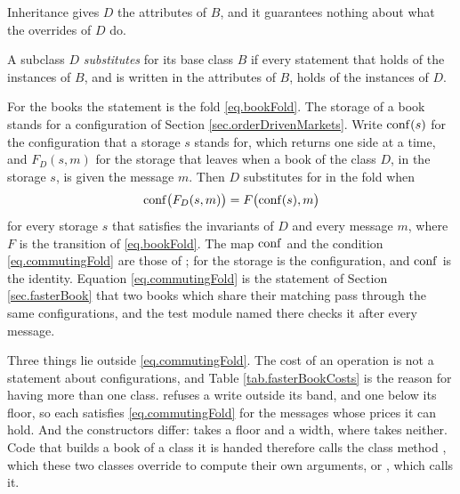 Inheritance gives $D$ the attributes of $B$,
and it guarantees nothing about what the overrides of $D$ do.

\begin{defi}\label{def.substitution}
 A subclass $D$ \emph{substitutes} for its base class $B$
 if every statement that holds of the instances of $B$,
 and is written in the attributes of $B$,
 holds of the instances of $D$.
\end{defi}

For the books the statement is the fold \eqref{eq.bookFold}.
The storage of a book stands for a configuration of Section \ref{sec.orderDrivenMarkets}.
Write $\mathrm{conf}(s)$ for the configuration that a storage $s$ stands for,
which  returns one side at a time,
and $F_D(s, m)$ for the storage that  leaves
when a book of the class $D$, in the storage $s$, is given the message $m$.
Then $D$ substitutes for  in the fold when
\begin{equation}\label{eq.commutingFold}
 \mathrm{conf}\big(F_D(s, m)\big) = F\big(\mathrm{conf}(s), m\big)
\end{equation}
for every storage $s$ that satisfies the invariants of $D$ and every message $m$,
where $F$ is the transition of \eqref{eq.bookFold}.
The map $\mathrm{conf}$ and the condition \eqref{eq.commutingFold}
are those of \cite{Hoa72pro};
for  the storage is the configuration,
and $\mathrm{conf}$ is the identity.
Equation \eqref{eq.commutingFold} is the statement of Section \ref{sec.fasterBook}
that two books which share their matching pass through the same configurations,
and the test module named there checks it after every message.

\begin{remark}\label{remark.limitsOfSubstitution}
 Three things lie outside \eqref{eq.commutingFold}.
 The cost of an operation is not a statement about configurations,
 and Table \ref{tab.fasterBookCosts} is the reason for having more than one class.
  refuses a write outside its band,
 and  one below its floor,
 so each satisfies \eqref{eq.commutingFold} for the messages whose prices it can hold.
 And the constructors differ:
  takes a floor and a width,
 where  takes neither.
 Code that builds a book of a class it is handed
 therefore calls the class method ,
 which these two classes override to compute their own arguments,
 or , which calls it.
\end{remark}

